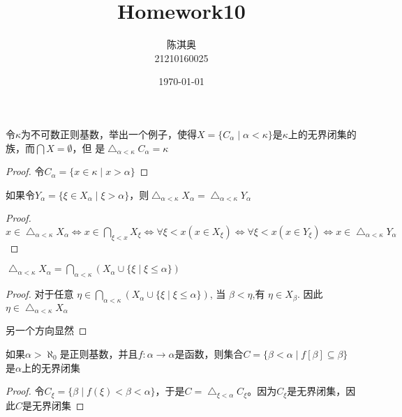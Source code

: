 \documentclass[11pt]{article}
\author{陈淇奥\\21210160025}
\date{\today}
\title{Homework10}
\begin{document}
\maketitle
\begin{exercise}[3.4.6]
令\(\kappa\)为不可数正则基数，举出一个例子，使得\(X=\{C_\alpha\mid\alpha<\kappa\}\)是\(\kappa\)上的无界闭集的族，而\(\bigcap X=\emptyset\)，但
是\(\bigtriangleup_{\alpha<\kappa}C_\alpha=\kappa\)
\end{exercise}

\begin{proof}
令\(C_\alpha=\{x\in\kappa\mid x>\alpha\}\)
\end{proof}

\begin{exercise}[3.4.7]
如果令\(Y_\alpha=\{\xi\in X_\alpha\mid\xi>\alpha\}\)，则\(\bigtriangleup_{\alpha<\kappa}X_\alpha=\bigtriangleup_{\alpha<\kappa}Y_\alpha\)
\end{exercise}

\begin{proof}
\(x\in\bigtriangleup_{\alpha<\kappa}X_\alpha\Leftrightarrow x\in\bigcap_{\xi<x}X_\xi\Leftrightarrow\forall\xi<x(x\in X_\xi)\Leftrightarrow\forall\xi<x(x\in Y_\xi)\Leftrightarrow x\in\bigtriangleup_{\alpha<\kappa}Y_\alpha\)
\end{proof}

\begin{exercise}[3.4.8]
\(\bigtriangleup_{\alpha<\kappa}X_\alpha=\bigcap_{\alpha<\kappa}(X_\alpha\cup\{\xi\mid\xi\le\alpha\})\)
\end{exercise}

\begin{proof}
对于任意 \(\eta\in\bigcap_{\alpha<\kappa}(X_\alpha\cup\{\xi\mid\xi\le\alpha\})\), 当 \(\beta<\eta\),有 \(\eta\in X_\beta\). 因此 \(\eta\in\bigtriangleup_{\alpha<\kappa}X_\alpha\)

另一个方向显然
\end{proof}

\begin{exercise}[3.4.16]
如果\(\alpha>\aleph_0\)是正则基数，并且\(f:\alpha\to\alpha\)是函数，则集合\(C=\{\beta<\alpha\mid f[\beta]\subseteq\beta\}\)是\(\alpha\)上的无界闭集
\end{exercise}

\begin{proof}
令\(C_\xi=\{\beta\mid f(\xi)<\beta<\alpha\}\)，于是\(C=\bigtriangleup_{\xi<\alpha}C_\xi\)。因为\(C_\xi\)是无界闭集，因此\(C\)是无界闭集
\end{proof}
\end{document}
